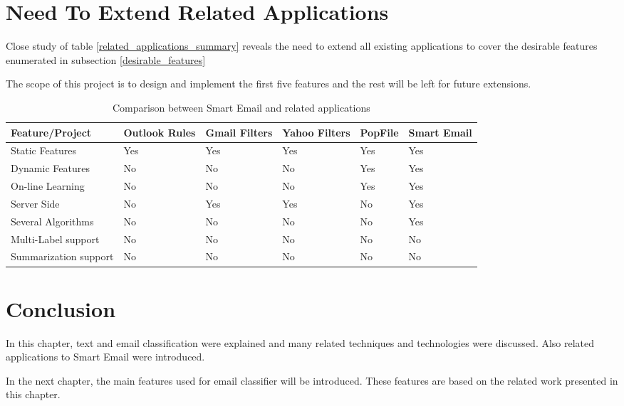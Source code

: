 \section{Need To Extend Related Applications}
\label{sec:need_to_extend}
Close study of table \ref{related_applications_summary} reveals the need to extend all existing applications to cover the desirable features enumerated in subsection \ref{desirable_features}

The scope of this project is to design and implement the first five features and the rest will be left for future extensions.

\begin{center}
    \begin{table}[H]
      \begin{tabular}{ | p{3cm} | p{2cm} | p{2cm} | p{2cm} | p{2cm} | p{2cm} |}
        \hline
        Feature/Project              & Outlook Rules \cite{OUTLOOK_REF} & Gmail Filters \cite{GMAIL_FILTERS} & 
        Yahoo Filters \cite{YAHOO_FILTERS} & PopFile \cite{POPFILE} & Smart Email\\ \hline
        Static Features  &    Yes        &    Yes        &    Yes      &    Yes  & \cellcolor[gray]{0.9}Yes \\ \hline     
        Dynamic Features &    No        &    No         &    No        &    Yes  & \cellcolor[gray]{0.9}Yes  \\ \hline
        On-line Learning &    No        &    No         &    No        &    Yes  & \cellcolor[gray]{0.9}Yes \\ \hline
        Server Side      &    No        &    Yes        &    Yes       &    No   & \cellcolor[gray]{0.9}Yes\\ \hline
        Several Algorithms &    No        &    No &    No       &    No   & \cellcolor[gray]{0.9}Yes\\ \hline
        Multi-Label support &    No        &    No &    No       &    No  & \cellcolor[gray]{0.9}No \\ \hline
        Summarization support&    No        &    No &    No       &    No & \cellcolor[gray]{0.9}No  \\ \hline
      \end{tabular}
      \caption[Comparison between Smart Email and related applications]
      {Comparison between Smart Email and related applications}
    \end{table}
\end{center}  

\section{Conclusion}
\label{sec:conclusion_2}
In this chapter, text and email classification were explained and many related techniques 
and technologies were discussed. Also related applications to Smart Email were introduced.

In the next chapter, the main features used for email classifier will be introduced. 
These features are based on the related work presented in this chapter.

